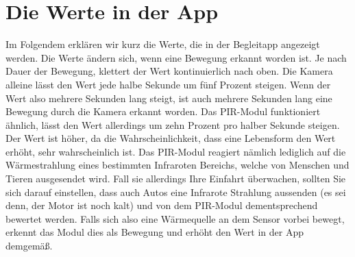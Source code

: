\documentclass[12pt,a4paper]{scrreprt}
\begin{document}
\section{Die Werte in der App}
Im Folgendem erklären wir kurz die Werte, die in der Begleitapp angezeigt werden. Die Werte ändern sich, wenn eine Bewegung erkannt worden ist. Je nach Dauer der Bewegung, klettert der Wert kontinuierlich nach oben. Die Kamera alleine lässt den Wert jede halbe Sekunde um fünf Prozent  steigen. Wenn der Wert also mehrere Sekunden lang steigt, ist auch mehrere Sekunden lang eine Bewegung durch die Kamera erkannt worden. Das PIR-Modul funktioniert ähnlich, lässt den Wert allerdings um zehn Prozent pro halber Sekunde steigen. Der Wert ist höher, da die Wahrscheinlichkeit, dass eine Lebensform den Wert erhöht, sehr wahrscheinlich ist. Das PIR-Modul reagiert nämlich lediglich auf die Wärmestrahlung eines bestimmten Infraroten Bereichs, welche von Menschen und Tieren ausgesendet wird. Fall sie allerdings Ihre Einfahrt überwachen, sollten Sie sich darauf einstellen, dass auch Autos eine Infrarote Strahlung aussenden (es sei denn, der Motor ist noch kalt) und von dem PIR-Modul dementsprechend bewertet werden. Falls sich also eine Wärmequelle an dem Sensor vorbei bewegt, erkennt das Modul dies als Bewegung und erhöht den Wert in der App demgemäß. 
\end{document}
